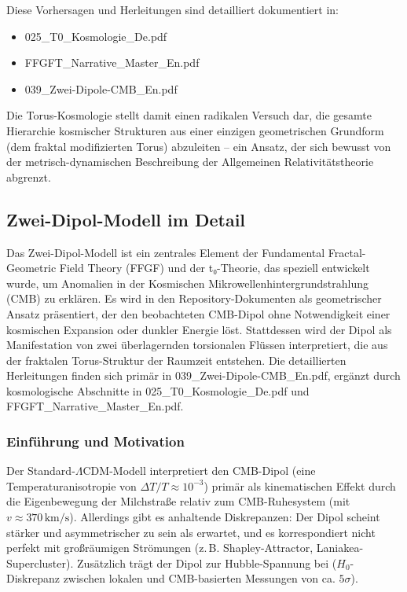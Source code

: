 \documentclass[12pt,a4paper]{article}
\begin{document}
	Diese Vorhersagen und Herleitungen sind detailliert dokumentiert in:
	\begin{itemize}
		\item 025\_T0\_Kosmologie\_De.pdf
		\item FFGFT\_Narrative\_Master\_En.pdf
		\item 039\_Zwei-Dipole-CMB\_En.pdf
	\end{itemize}
	
	Die Torus-Kosmologie stellt damit einen radikalen Versuch dar, die gesamte Hierarchie kosmischer Strukturen aus einer einzigen geometrischen Grundform (dem fraktal modifizierten Torus) abzuleiten – ein Ansatz, der sich bewusst von der metrisch-dynamischen Beschreibung der Allgemeinen Relativitätstheorie abgrenzt.
	\subsection{Zwei-Dipol-Modell im Detail}
	
	Das Zwei-Dipol-Modell ist ein zentrales Element der Fundamental Fractal-Geometric Field Theory (FFGF) und der t₀-Theorie, das speziell entwickelt wurde, um Anomalien in der Kosmischen Mikrowellenhintergrundstrahlung (CMB) zu erklären. Es wird in den Repository-Dokumenten als geometrischer Ansatz präsentiert, der den beobachteten CMB-Dipol ohne Notwendigkeit einer kosmischen Expansion oder dunkler Energie löst. Stattdessen wird der Dipol als Manifestation von zwei überlagernden torsionalen Flüssen interpretiert, die aus der fraktalen Torus-Struktur der Raumzeit entstehen. Die detaillierten Herleitungen finden sich primär in 039\_Zwei-Dipole-CMB\_En.pdf, ergänzt durch kosmologische Abschnitte in 025\_T0\_Kosmologie\_De.pdf und FFGFT\_Narrative\_Master\_En.pdf.
	
	\subsubsection{Einführung und Motivation}
	
	Der Standard-$\Lambda$CDM-Modell interpretiert den CMB-Dipol (eine Temperaturanisotropie von $\Delta T / T \approx 10^{-3}$) primär als kinematischen Effekt durch die Eigenbewegung der Milchstraße relativ zum CMB-Ruhesystem (mit $v \approx 370\,\text{km/s}$). Allerdings gibt es anhaltende Diskrepanzen: Der Dipol scheint stärker und asymmetrischer zu sein als erwartet, und es korrespondiert nicht perfekt mit großräumigen Strömungen (z.\,B. Shapley-Attractor, Laniakea-Supercluster). Zusätzlich trägt der Dipol zur Hubble-Spannung bei ($H_0$-Diskrepanz zwischen lokalen und CMB-basierten Messungen von ca. $5\sigma$).
	
\end{document}

